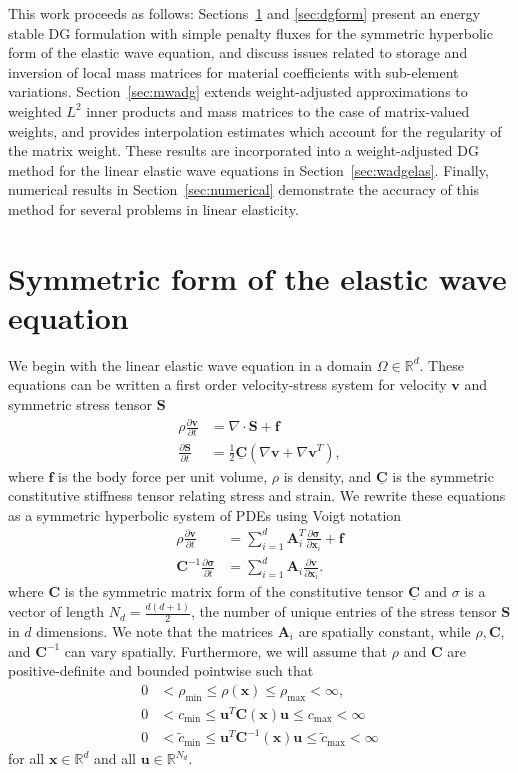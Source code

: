 \documentclass{siamart0216}
\newcommand{\tensor}[1]{\underline{\bm{#1}}}
\newcommand{\pd}[2]{\frac{\partial#1}{\partial#2}}
\newcommand{\LRp}[1]{\left( #1 \right)}
\newcommand{\Grad} {\ensuremath{\nabla}}
\newcommand{\Div} {\ensuremath{\nabla\cdot}}
\begin{document}
This work proceeds as follows: Sections~\ref{sec:symelas} and \ref{sec:dgform} present an energy stable DG formulation with simple penalty fluxes for the symmetric hyperbolic form of the elastic wave equation, and discuss issues related to storage and inversion of local mass matrices for material coefficients with sub-element variations.  Section~\ref{sec:mwadg} extends weight-adjusted approximations to weighted $L^2$ inner products and mass matrices to the case of matrix-valued weights, and provides interpolation estimates which account for the regularity of the matrix weight.  These results are incorporated into a weight-adjusted DG method for the linear elastic wave equations in Section~\ref{sec:wadgelas}.  Finally, numerical results in Section~\ref{sec:numerical} demonstrate the accuracy of this method for several problems in linear elasticity.  

\section{Symmetric form of the elastic wave equation}
\label{sec:symelas}
We begin with the linear elastic wave equation in a domain $\Omega \in \mathbb{R}^d$.  These equations can be written a first order velocity-stress system for velocity $\bm{v}$ and symmetric stress tensor $\bm{S}$ 
\begin{align*}
\rho \pd{\bm{v}}{t} &= \Div{\bm{S}} + \bm{f}\\
\pd{\bm{S}}{t} &= \frac{1}{2} \tensor{\bm{C}}\LRp{\Grad\bm{v} + \Grad\bm{v}^T},
\end{align*}
where $\bm{f}$ is the body force per unit volume, $\rho$ is density, and $\tensor{\bm{C}}$ is the symmetric constitutive stiffness tensor relating stress and strain.  We rewrite these equations as a symmetric hyperbolic system of PDEs \cite{hughes1978classical} using Voigt notation
\begin{align}
\rho \pd{\bm{v}}{t} &= \sum_{i=1}^d \bm{A}_i^T \pd{\bm{\sigma}}{\bm{x}_i}\nonumber + \bm{f}\\
\bm{C}^{-1} \pd{\bm{\sigma}}{t} &= \sum_{i=1}^d \bm{A}_i \pd{\bm{v}}{\bm{x}_i}.
\label{eq:symelas}
\end{align}
where $\bm{C}$ is the symmetric matrix form of the constitutive tensor $\tensor{\bm{C}}$ and $\sigma$ is a vector of length $N_d = \frac{d(d+1)}{2}$, the number of unique entries of the stress tensor $\bm{S}$ in $d$ dimensions.  We note that the matrices $\bm{A}_i$ are spatially constant, while $\rho,\bm{C}$, and $\bm{C}^{-1}$ can vary spatially.  Furthermore, we will assume that $\rho$ and $\bm{C}$ are positive-definite and bounded pointwise such that 
\begin{align*}
0 &< \rho_{\min} \leq \rho(\bm{x}) \leq \rho_{\max} < \infty, \\
0 &< c_{\min} \leq \bm{u}^T\bm{C}(\bm{x})\bm{u} \leq c_{\max} < \infty\\
0 &< \tilde{c}_{\min} \leq \bm{u}^T\bm{C}^{-1}(\bm{x})\bm{u} \leq \tilde{c}_{\max} < \infty
\end{align*}
for all $\bm{x}\in \mathbb{R}^d$ and all $\bm{u} \in \mathbb{R}^{N_d}$.  
\end{document}
